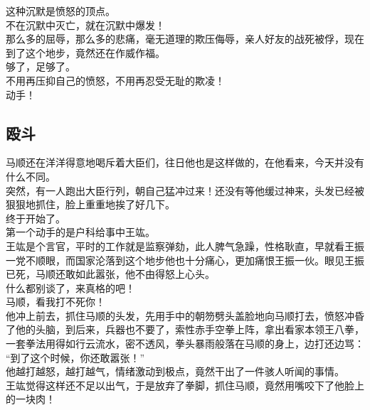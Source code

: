 \begin{multicols}{\theparacolNo}
这种沉默是愤怒的顶点。\\

不在沉默中灭亡，就在沉默中爆发！\\

那么多的屈辱，那么多的悲痛，毫无道理的欺压侮辱，亲人好友的战死被俘，现在到了这个地步，竟然还在作威作福。\\

够了，足够了。\\

不用再压抑自己的愤怒，不用再忍受无耻的欺凌！\\

动手！\\

\subsection{殴斗}
马顺还在洋洋得意地喝斥着大臣们，往日他也是这样做的，在他看来，今天并没有什么不同。\\

突然，有一人跑出大臣行列，朝自己猛冲过来！还没有等他缓过神来，头发已经被狠狠地抓住，脸上重重地挨了好几下。\\

终于开始了。\\

第一个动手的是户科给事中王竑。\\

王竑是个言官，平时的工作就是监察弹劾，此人脾气急躁，性格耿直，早就看王振一党不顺眼，而国家沦落到这个地步他也十分痛心，更加痛恨王振一伙。眼见王振已死，马顺还敢如此嚣张，他不由得怒上心头。\\

什么都别谈了，来真格的吧！\\

马顺，看我打不死你！\\

他冲上前去，抓住马顺的头发，先用手中的朝笏劈头盖脸地向马顺打去，愤怒冲昏了他的头脑，到后来，兵器也不要了，索性赤手空拳上阵，拿出看家本领王八拳，一套拳法用得如行云流水，密不透风，拳头暴雨般落在马顺的身上，边打还边骂：\\

“到了这个时候，你还敢嚣张！”\\

他越打越怒，越打越气，情绪激动到极点，竟然干出了一件骇人听闻的事情。\\

王竑觉得这样还不足以出气，于是放弃了拳脚，抓住马顺，竟然用嘴咬下了他脸上的一块肉！\\


\end{multicols}
